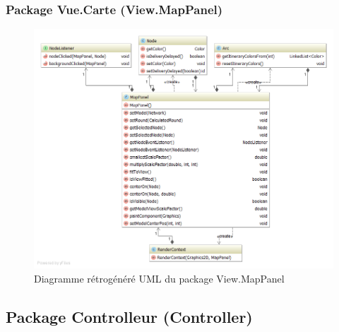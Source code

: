 \subsubsection{Package Vue.Carte (View.MapPanel)}

\begin{figure}[h]
    \centering
    \includegraphics[width=160mm]{../diagrams/classes_packages/final_classes_packages/view/package_map.png}
    \caption{Diagramme r\'etrog\'en\'er\'e UML du package View.MapPanel}
    \label{diagram:gen_uml_view_map}
\end{figure}
\pagebreak

\subsection{Package Controlleur (Controller)}


